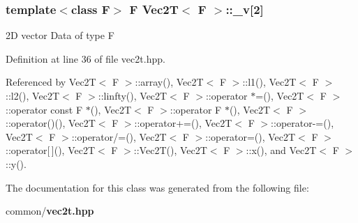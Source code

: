 \subsubsection{\setlength{\rightskip}{0pt plus 5cm}template$<$class F$>$ F {\bf Vec2T}$<$ F $>$::{\bf \_\-v}[2]\hspace{0.3cm}{\tt  [private]}}\label{classVec2T_bae464d64958ef01a884be1848619292_bae464d64958ef01a884be1848619292}


2D vector Data of type F 

Definition at line 36 of file vec2t.hpp.

Referenced by Vec2T$<$ F $>$::array(), Vec2T$<$ F $>$::l1(), Vec2T$<$ F $>$::l2(), Vec2T$<$ F $>$::linfty(), Vec2T$<$ F $>$::operator $\ast$=(), Vec2T$<$ F $>$::operator const F $\ast$(), Vec2T$<$ F $>$::operator F $\ast$(), Vec2T$<$ F $>$::operator()(), Vec2T$<$ F $>$::operator+=(), Vec2T$<$ F $>$::operator-=(), Vec2T$<$ F $>$::operator/=(), Vec2T$<$ F $>$::operator=(), Vec2T$<$ F $>$::operator[$\,$](), Vec2T$<$ F $>$::Vec2T(), Vec2T$<$ F $>$::x(), and Vec2T$<$ F $>$::y().

The documentation for this class was generated from the following file:\begin{CompactItemize}
\item 
common/{\bf vec2t.hpp}\end{CompactItemize}
